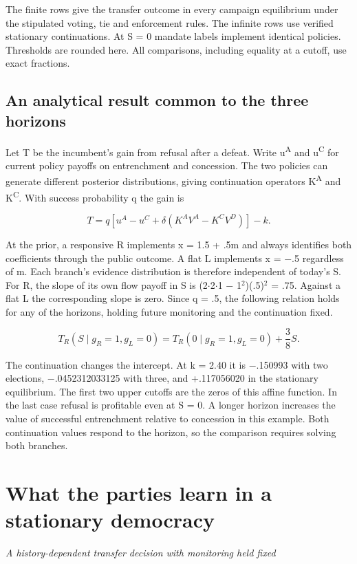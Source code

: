 \documentclass[11pt]{article}
\begin{document}
The finite rows give the transfer outcome in every campaign equilibrium under the stipulated voting, tie and enforcement rules. The infinite rows use verified stationary continuations. At S = 0 mandate labels implement identical policies. Thresholds are rounded here. All comparisons, including equality at a cutoff, use exact fractions.

\subsection*{An analytical result common to the three horizons}

Let T be the incumbent's gain from refusal after a defeat. Write u\textsuperscript{A} and u\textsuperscript{C} for current policy payoffs on entrenchment and concession. The two policies can generate different posterior distributions, giving continuation operators K\textsuperscript{A} and K\textsuperscript{C}. With success probability q the gain is

\[T=q\left[u^A-u^C+\delta\left(K^A V^A-K^C V^D\right)\right]-k.\]

At the prior, a responsive R implements x = 1.5 + .5m and always identifies both coefficients through the public outcome. A flat L implements x = $-$.5 regardless of m. Each branch's evidence distribution is therefore independent of today's S. For R, the slope of its own flow payoff in S is (2$\cdot$2$\cdot$1 $-$ 1${}^2$)(.5)${}^2$ = .75. Against a flat L the corresponding slope is zero. Since q = .5, the following relation holds for any of the horizons, holding future monitoring and the continuation fixed.

\[T_R(S\mid g_R=1,g_L=0)=T_R(0\mid g_R=1,g_L=0)+\frac{3}{8}S.\]

The continuation changes the intercept. At k = 2.40 it is $-$.150993 with two elections, $-$.0452312033125 with three, and +.117056020 in the stationary equilibrium. The first two upper cutoffs are the zeros of this affine function. In the last case refusal is profitable even at S = 0. A longer horizon increases the value of successful entrenchment relative to concession in this example. Both continuation values respond to the horizon, so the comparison requires solving both branches.

\section*{What the parties learn in a stationary democracy}
\emph{A history-dependent transfer decision with monitoring held fixed}
\end{document}
